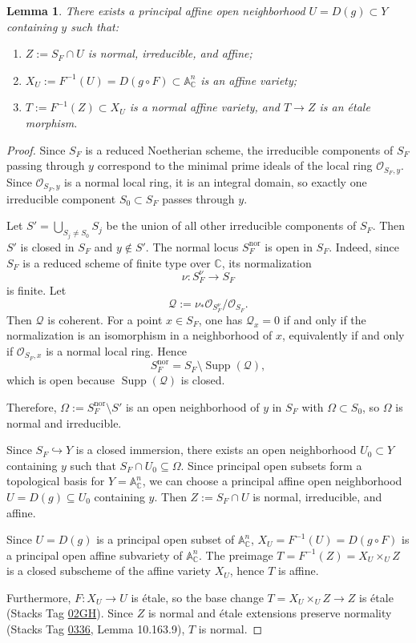 \documentclass[11pt,reqno]{amsart}
\theoremstyle{plain}
\newtheorem{lemma}[theorem]{Lemma}
\theoremstyle{definition}
\numberwithin{equation}{section}
\DeclareMathOperator{\Supp}{Supp}
\newcommand{\A}{\mathbb{A}}
\newcommand{\C}{\mathbb{C}}
\newcommand{\cO}{\mathcal{O}}
\begin{document}
\begin{lemma}\label{lem:normal-neighborhood}
There exists a principal affine open neighborhood $U = D(g) \subset Y$ containing $y$ such that:
\begin{enumerate}[(1)]
\item $Z := S_F \cap U$ is normal, irreducible, and affine;
\item $X_U := F^{-1}(U) = D(g \circ F) \subset \A^n_\C$ is an affine variety;
\item $T := F^{-1}(Z) \subset X_U$ is a normal affine variety, and $T \to Z$ is an \'{e}tale morphism.
\end{enumerate}
\end{lemma}
\begin{proof}
Since $S_F$ is a reduced Noetherian scheme, the irreducible components of $S_F$ passing through $y$ correspond to the minimal prime ideals of the local ring $\cO_{S_F, y}$.
Since $\cO_{S_F, y}$ is a normal local ring, it is an integral domain, so exactly one irreducible component $S_0 \subset S_F$ passes through $y$.

Let $S' = \bigcup_{S_j \neq S_0} S_j$ be the union of all other irreducible components of $S_F$. Then $S'$ is closed in $S_F$ and $y \notin S'$.
The normal locus $S_F^{\mathrm{nor}}$ is open in $S_F$. Indeed, since $S_F$ is a reduced scheme of finite type over $\C$, its normalization
\[
\nu: S_F^\nu \longrightarrow S_F
\]
is finite.  Let
\[
\mathcal Q := \nu_* \cO_{S_F^\nu} / \cO_{S_F}.
\]
Then $\mathcal Q$ is coherent. For a point $x \in S_F$, one has $\mathcal Q_x = 0$ if and only if the normalization is an isomorphism in a neighborhood of $x$, equivalently if and only if $\cO_{S_F, x}$ is a normal local ring. Hence
\[
S_F^{\mathrm{nor}} = S_F \setminus \Supp(\mathcal Q),
\]
which is open because $\Supp(\mathcal Q)$ is closed.

Therefore, $\Omega := S_F^{\mathrm{nor}} \setminus S'$ is an open neighborhood of $y$ in $S_F$ with $\Omega \subset S_0$, so $\Omega$ is normal and irreducible.

Since $S_F \hookrightarrow Y$ is a closed immersion, there exists an open neighborhood $U_0 \subset Y$ containing $y$ such that $S_F \cap U_0 \subseteq \Omega$.
Since principal open subsets form a topological basis for $Y = \A^n_\C$, we can choose a principal affine open neighborhood $U = D(g) \subseteq U_0$ containing $y$.
Then $Z := S_F \cap U$ is normal, irreducible, and affine.

Since $U = D(g)$ is a principal open subset of $\A^n_\C$, $X_U = F^{-1}(U) = D(g \circ F)$ is a principal open affine subvariety of $\A^n_\C$. The preimage $T = F^{-1}(Z) = X_U \times_U Z$ is a closed subscheme of the affine variety $X_U$, hence $T$ is affine.

Furthermore, $F: X_U \to U$ is \'{e}tale, so the base change $T = X_U \times_U Z \to Z$ is \'{e}tale (Stacks Tag \href{https://stacks.math.columbia.edu/tag/02GH}{02GH}). Since $Z$ is normal and \'{e}tale extensions preserve normality (Stacks Tag \href{https://stacks.math.columbia.edu/tag/0336}{0336}, Lemma 10.163.9), $T$ is normal.
\end{proof}
\end{document}
